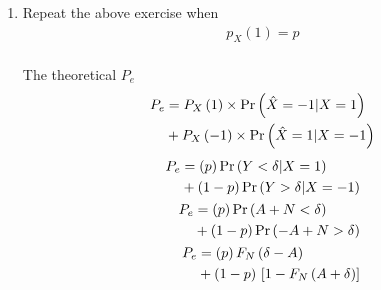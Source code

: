 \documentclass[journal,12pt,twocolumn]{IEEEtran}
\renewcommand\thesection{\arabic{section}}
\begin{document}
\begin{enumerate}[label=\thesection.\arabic*
,ref=\thesection.\theenumi]
\begin{align}
\begin{split}
\end{split} \\
    P_e &= \frac{1}{2} \sbrak{ F_N\brak{\delta-A} 
    + 1 - F_N\brak{A+\delta}  } \label{eq:Pe_threshold} 
\end{align}
%
To find maximum $P_e$, we can differenciate \eqref{eq:Pe_threshold}
\begin{align}
	0 &= \frac{dP_e}{d\delta} \\
	0 &= \frac{1}{2} \sbrak{ p_N\brak{\delta-A} -p_N\brak{A+\delta} }
\end{align}
\begin{align}
	p_N\brak{\delta-A}  &= p_N\brak{A+\delta} \\
	\frac{ \exp{ \brak{- \frac{\brak{\delta-A}^2}{2} } }}  {\sqrt{2\pi}} &= 
	\frac{ \exp{ \brak{- \frac{\brak{A+\delta}^2}{2} } }}  {\sqrt{2\pi}} \\
	\brak{\delta-A}^2 &= \brak{\delta+A}^2 \\
	A = 0 \text{ or } \delta &= 0 
\end{align}
We discard the first case. Thus $\delta =0 $
%
\item Repeat the above exercise when 
	\begin{align}
		p_{X}(1) = p %
	\end{align}
\\
\solution
The theoretical $P_e$
\begin{align}
\begin{split}
    P_e &= P_X\left(1\right) \times \Pr\left(\hat{X} = -1|X=1\right) \\
    &+ P_X\left(-1\right) \times \Pr\left(\hat{X} = 1|X= -1\right)
\end{split} 
\end{align}
\begin{align}
\begin{split}
    P_e &= \brak{p} \pr{Y < \delta|X=1} \\
    &+ \brak{1-p}  \pr{Y>\delta|X= -1} 
\end{split} \\
\begin{split}
    P_e &= \brak{p} \pr{A + N < \delta} \\
    &+ \brak{1-p} \pr{-A + N > \delta} 
\end{split} \\
\begin{split}
    P_e &= \brak{p} F_N\brak{\delta-A} \\
    &+ \brak{1-p}\sbrak{1 - F_N\brak{A+\delta}  } \label{eq:Pe_threshold2} 
\end{split}

\end{align}
\end{enumerate}
\end{document}

